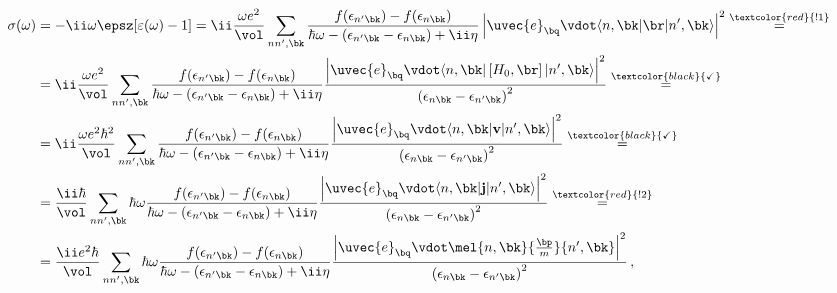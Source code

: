 \begin{equation}
    \label{eq:optical_conductivity_manipulation}
    \begin{aligned}
        \sigma(\omega)&=-\ii\omega\epsz[\varepsilon(\omega)-1] = \ii\frac{\omega e^{2}}{\vol}\sum_{nn',\bk}\frac{f(\epsilon_{n' \bk})-f(\epsilon_{n \bk})}{\hbar \omega - (\epsilon_{n' \bk} - \epsilon_{n \bk}) + \ii \eta}\left|\uvec{e}_{\bq}\vdot\langle n,\bk|\br|n',\bk\rangle\right|^2 \stackrel{\textcolor{red}{!1}}{=}\\
        &=\ii\frac{\omega e^{2}}{\vol}\sum_{nn',\bk}\frac{f(\epsilon_{n' \bk})-f(\epsilon_{n \bk})}{\hbar \omega - (\epsilon_{n' \bk} - \epsilon_{n \bk}) + \ii \eta}\frac{\left|\uvec{e}_{\bq}\vdot\langle n,\bk|\left[H_0,\br\right]|n',\bk\rangle\right|^2}{\left(\epsilon_{n \bk}-\epsilon_{n' \bk}\right)^{2}}\stackrel{\textcolor{black}{\checkmark}}{=} \\
        &=\ii\frac{\omega e^{2} \hbar^2}{\vol}\sum_{nn',\bk}\frac{f(\epsilon_{n' \bk})-f(\epsilon_{n \bk})}{\hbar \omega - (\epsilon_{n' \bk} - \epsilon_{n \bk}) + \ii \eta}\frac{\left|\uvec{e}_{\bq}\vdot\langle n,\bk|\mathbf{v}|n',\bk\rangle\right|^2}{\left(\epsilon_{n \bk}-\epsilon_{n' \bk}\right)^{2}} \stackrel{\textcolor{black}{\checkmark}}{=} \\
        &=\frac{\ii\hbar}{\vol}\sum_{nn',\bk}\hbar\omega\frac{f(\epsilon_{n' \bk})-f(\epsilon_{n \bk})}{\hbar \omega - (\epsilon_{n' \bk} - \epsilon_{n \bk}) + \ii \eta}\frac{\left|\uvec{e}_{\bq}\vdot\langle n,\bk|\mathbf{j}|n',\bk\rangle\right|^2}{\left(\epsilon_{n \bk}-\epsilon_{n' \bk}\right)^{2}} \stackrel{\textcolor{red}{!2}}{=} \\
        &=\frac{\ii e^{2}\hbar}{\vol}\sum_{nn',\bk}\hbar\omega\frac{f(\epsilon_{n' \bk})-f(\epsilon_{n \bk})}{\hbar \omega - (\epsilon_{n' \bk} - \epsilon_{n \bk}) + \ii \eta}\frac{\left|\uvec{e}_{\bq} \vdot \mel{n,\bk}{\frac{\bp}{m}}{n',\bk} \right|^2}{\left(\epsilon_{n \bk}-\epsilon_{n' \bk}\right)^{2}}\,,
    \end{aligned}
\end{equation}


